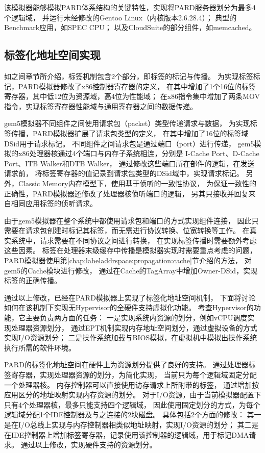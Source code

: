 该模拟器能够模拟PARD体系结构的关键特性，实现将PARD服务器划分为最多4个逻辑域，
并运行未经修改的Gentoo Linux（内核版本2.6.28.4）；
典型的Benchmark应用，如SPEC CPU\cite{cpu2006}；
以及CloudSuite\cite{Ferdman:2012:cloudsuite}的部分组件，如memcached\cite{memcached}。


\subsection{标签化地址空间实现}
\label{chap:labeladdrspace:simimpl}

如之间章节所介绍，标签机制包含2个部分，即标签的标记与传播。
为实现标签标记，PARD模拟器修改了x86控制器寄存器的定义，
在其中增加了1个16位的标签寄存器，其中低12位为资源域，高4位为性能域；
在x86指令集中增加了两条MOV指令，实现标签寄存器性能域与通用寄存器之间的数据传递。

gem5模拟器不同组件之间使用请求包（packet）类型传递请求与数据，
为实现标签传播，PARD模拟器扩展了请求包类型的定义，
在其中增加了16位的标签域DSid用于请求标记。
不同组件之间请求包是通过端口（port）进行传递，
gem5模拟的x86处理器核通过4个端口与内存子系统相连，分别是
I-Cache Port、D-Cache Port、ITB Walker和DTB Walker，
通过修改这些端口所在部件的逻辑，在发送请求前，
将标签寄存器的值记录到请求包类型的DSid域中，实现请求标记。
另外，Classic Memory内存模型下，使用基于侦听的一致性协议，
为保证一致性的正确性，PARD模拟器还修改了处理器核侦听端口的逻辑，
另其只接收并回复来自相同应用标签的侦听请求。

由于gem5模拟器在整个系统中都使用请求包和端口的方式实现组件连接，
因此只需要在请求包创建时标记其标签，而无需进行协议转换、位宽转换等工作。
在真实系统中，请求需要在不同协议之间进行转换，
在实现标签传播时需要额外考虑这些因素。
标签在处理器末级缓存中传播是模拟器实现时需要重点考虑的问题，
PARD模拟器使用第\ref{chap:labeladdrspace:propagation:cache}节介绍的方法，
对gem5的Cache模块进行修改，
通过在Cache的TagArray中增加Owner-DSid，实现标签的正确传播。


通过以上修改，已经在PARD模拟器上实现了标签化地址空间机制，
下面将讨论如何在该机制下实现无Hypervisor的全硬件支持虚拟化功能。
考查Hypervisor的功能，它主要负责两方面的任务：
一是实现系统内资源的划分，例如vCPU调度实现处理器资源划分，
通过EPT机制实现内存地址空间划分，通过虚拟设备的方式实现I/O资源划分；
二是操作系统加载与BIOS模拟，在虚拟机中模拟出操作系统执行所需的软件环境。

PARD的标签化地址空间在硬件上为资源划分提供了良好的支持。
通过处理器标签寄存器，实现处理器资源的划分，为简化实现，
当前只为每个逻辑域固定分配一个处理器核。
内存控制器可以直接使用访存请求上所附带的标签，
通过增加按应用区分的地址映射实现内存资源的划分。
对于I/O资源，由于当前模拟器配置下只有4个处理器核，最多只能支持四个逻辑域，
因此使用固定划分的方式，为每个逻辑域分配1个IDE控制器及与之连接的2块磁盘。
具体包括2个方面的修改：
其一是在I/O总线上实现与内存控制器相类似地址映射，实现I/O资源的划分；
其二是在IDE控制器上增加标签寄存器，记录使用该控制器的逻辑域，用于标记DMA请求。
通过以上修改，实现硬件支持的资源划分。

